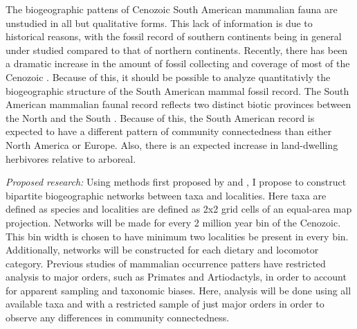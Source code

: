 \documentclass[12pt,letterpaper]{article}
\begin{document}
The biogeographic pattens of Cenozoic South American mammalian fauna are unstudied in all but qualitative forms. This lack of information is due to historical reasons, with the fossil record of southern continents being in general under studied compared to that of northern continents. Recently, there has been a dramatic increase in the amount of fossil collecting and coverage of most of the Cenozoic \citep{Macfadden1997,Macfadden2006,Flynn1998a}. Because of this, it should be possible to analyze quantitativly the biogeographic structure of the South American mammal fossil record. The South American mammalian faunal record reflects two distinct biotic provinces between the North and the South \citep{Macfadden1997,Macfadden2006,Flynn1998a,Patterson1968}. Because of this, the South American record is expected to have a different pattern of community connectedness than either North America or Europe. Also, there is an expected increase in land-dwelling herbivores relative to arboreal.


\textit{Proposed research:}
Using methods first proposed by \citet{Sidor2013} and \citet{Vilhena2013}, I propose to construct bipartite biogeographic networks between taxa and localities. Here taxa are defined as species and localities are defined as 2x2 grid cells of an equal-area map projection. Networks will be made for every 2 million year bin of the Cenozoic. This bin width is chosen to have minimum two localities be present in every bin. Additionally, networks will be constructed for each dietary and locomotor category. Previous studies of mammalian occurrence patters have restricted analysis to major orders, such as Primates and Artiodactyls, in order to account for apparent sampling and taxonomic biases. Here, analysis will be done using all available taxa and with a restricted sample of just major orders in order to observe any differences in community connectedness.
\end{document}
